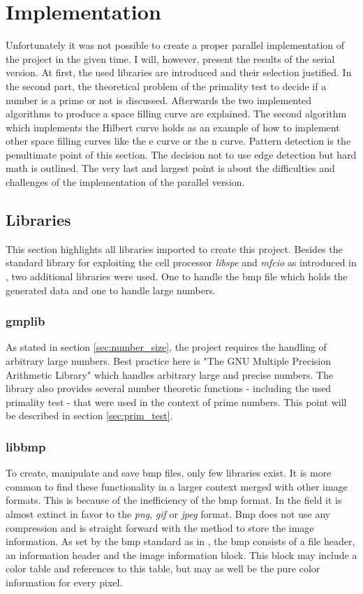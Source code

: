 \section{Implementation}
\label{sec:implementation}
Unfortunately it was not possible to create a proper parallel implementation of the project in the given time. I will, however, present the results of the serial version.
At first, the used libraries are introduced and their selection justified.
In the second part, the theoretical problem of the primality test to decide if a number is a prime or not is discussed. Afterwards the two implemented algorithms to produce a space filling curve are explained. The second algorithm which implements the Hilbert curve holds as an example of how to implement other space filling curves like the e curve or the n curve. Pattern detection is the penultimate point of this section. The decision not to use edge detection but hard math is outlined. The very last and largest point is about the difficulties and challenges of the implementation of the parallel version.

\subsection{Libraries}
\label{sec:libs}
This section highlights all libraries imported to create this project. Besides the standard library for exploiting the cell processor \emph{libspe} and \emph{mfcio} as introduced in \cite{cellguide}, two additional libraries were used. One to handle the bmp file which holds the generated data and one to handle large numbers.

\subsubsection{gmplib}
As stated in section \ref{sec:number_size}, the project requires the handling of arbitrary large numbers. Best practice here is "The GNU Multiple Precision Arithmetic Library" which handles arbitrary large and precise numbers. The library also provides several number theoretic functions - including the used primality test - that were used in the context of prime numbers. This point will be described in section \ref{sec:prim_test}.

\subsubsection{libbmp}
To create, manipulate and save bmp files, only few libraries exist. It is more common to find these functionality in a larger context merged with other image formats. This is because of the inefficiency of the bmp format. In the field it is almost extinct in favor to the \emph{png}, \emph{gif} or \emph{jpeg} format. Bmp does not use any compression and is straight forward with the method to store the image information. As set by the bmp standard as in \cite{bmp}, the bmp consists of a file header, an information header and the image information block. This block may include a color table and references to this table, but may as well be the pure color information for every pixel.

